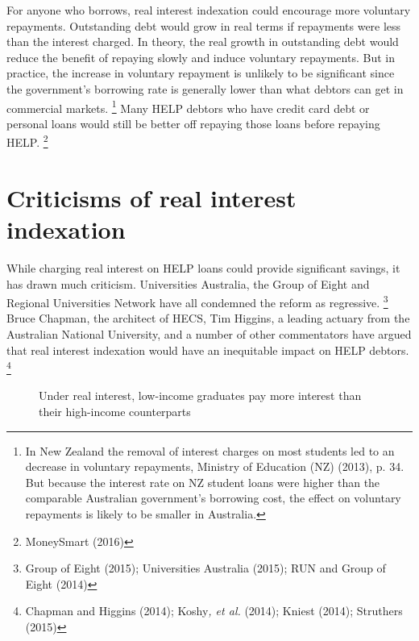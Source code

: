 \documentclass[embargoed]{grattan}
\begin{document}
{For anyone who borrows, real interest indexation could encourage more voluntary repayments.
Outstanding debt would grow in real terms if repayments were less than the interest charged.
In theory, the real growth in outstanding debt would reduce the benefit of repaying slowly and induce voluntary repayments.
But in practice, the increase in voluntary repayment is unlikely to be significant since the government's borrowing rate is generally lower than what debtors can get in commercial markets.%
\footnote{In New Zealand the removal of interest charges on most students led to an decrease in voluntary repayments, Ministry of Education (NZ) (2013), p. 34.
But because the interest rate on NZ student loans were higher than the comparable Australian government's borrowing cost, the effect on voluntary repayments is likely to be smaller in Australia.} Many \gls{HELP} debtors who have credit card debt or personal loans would still be better off repaying those loans before repaying \gls{HELP}.%
\footnote{MoneySmart (2016)}

\section{Criticisms of real interest indexation}\label{sec:criticisms-of-real-interest-indexation}

While charging real interest on \gls{HELP} loans could provide significant savings, it has drawn much criticism.
Universities Australia, the Group of Eight and Regional Universities Network have all condemned the reform as regressive.%
\footnote{Group of Eight (2015); Universities Australia (2015); RUN and Group of Eight (2014)} Bruce Chapman, the architect of \gls{HECS}, Tim Higgins, a leading actuary from the Australian National University, and a number of other commentators have argued that real interest indexation would have an inequitable impact on \gls{HELP} debtors.%
\footnote{Chapman and Higgins (2014); Koshy\emph{, et al.} (2014); Kniest (2014); Struthers (2015)}

\begin{figure}
\caption{Under real interest, low-income graduates pay more interest than their high-income counterparts}\label{fig:fig13-under-real-interest-low-income-grads-pay-more-interest-than-high-income-counterparts}



\end{figure}}
\end{document}

